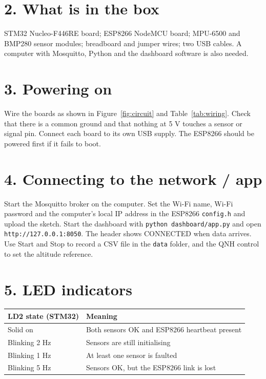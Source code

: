 \documentclass[12pt,a4paper]{report}
\begin{document}
\section*{2. What is in the box}
STM32 Nucleo-F446RE board; ESP8266 NodeMCU board; MPU-6500 and BMP280 sensor modules; breadboard and jumper wires; two USB cables. A computer with Mosquitto, Python and the dashboard software is also needed.

\section*{3. Powering on}
Wire the boards as shown in Figure~\ref{fig:circuit} and Table~\ref{tab:wiring}. Check that there is a common ground and that nothing at 5 V touches a sensor or signal pin. Connect each board to its own USB supply. The ESP8266 should be powered first if it fails to boot.

\section*{4. Connecting to the network / app}
Start the Mosquitto broker on the computer. Set the Wi-Fi name, Wi-Fi password and the computer's local IP address in the ESP8266 \texttt{config.h} and upload the sketch. Start the dashboard with \texttt{python dashboard/app.py} and open \texttt{http://127.0.0.1:8050}. The header shows CONNECTED when data arrives. Use Start and Stop to record a CSV file in the \texttt{data} folder, and the QNH control to set the altitude reference.

\section*{5. LED indicators}
\begin{center}
\begin{tabular}{ll}
\toprule
\textbf{LD2 state (STM32)} & \textbf{Meaning}\\
\midrule
Solid on & Both sensors OK and ESP8266 heartbeat present\\
Blinking 2 Hz & Sensors are still initialising\\
Blinking 1 Hz & At least one sensor is faulted\\
Blinking 5 Hz & Sensors OK, but the ESP8266 link is lost\\
\bottomrule
\end{tabular}
\end{center}
\end{document}
